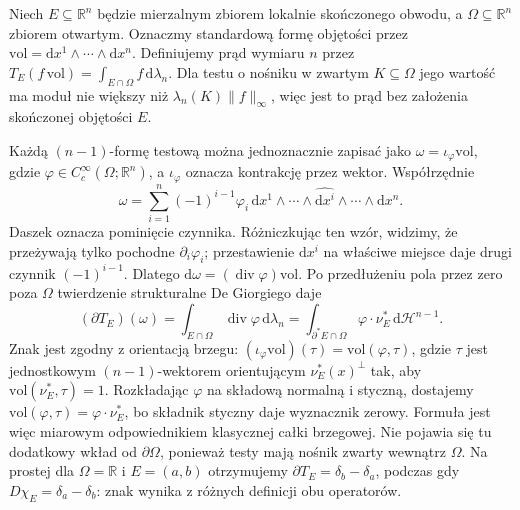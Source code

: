 \begin{przyklad}
Niech $E\subseteq\mathbb R^n$ będzie mierzalnym
zbiorem lokalnie skończonego obwodu, a
$\Omega\subseteq\mathbb R^n$ zbiorem otwartym.
Oznaczmy standardową formę objętości przez
$\mathrm{vol}=\mathrm dx^1\wedge\cdots\wedge\mathrm dx^n$.
Definiujemy prąd wymiaru $n$ przez
$T_E(f\,\mathrm{vol})=\int_{E\cap\Omega}
f\,\mathrm d\lambda_n$.
Dla testu o nośniku w zwartym $K\subseteq\Omega$
jego wartość ma moduł nie większy niż
$\lambda_n(K)\|f\|_\infty$, więc jest to prąd
bez założenia skończonej objętości $E$.

Każdą $(n-1)$-formę testową można jednoznacznie
zapisać jako $\omega=\iota_\varphi\mathrm{vol}$,
gdzie $\varphi\in C_c^\infty(\Omega;\mathbb R^n)$,
a $\iota_\varphi$ oznacza kontrakcję przez wektor.
Współrzędnie
\[
 \omega=\sum_{i=1}^n(-1)^{i-1}\varphi_i\,
 \mathrm dx^1\wedge\cdots\wedge
 \widehat{\mathrm dx^i}\wedge\cdots\wedge\mathrm dx^n.
\]
Daszek oznacza pominięcie czynnika. Różniczkując
ten wzór, widzimy, że przeżywają tylko pochodne
$\partial_i\varphi_i$; przestawienie $\mathrm dx^i$
na właściwe miejsce daje drugi czynnik
$(-1)^{i-1}$. Dlatego
$\mathrm d\omega=(\operatorname{div}\varphi)\mathrm{vol}$.
Po przedłużeniu pola przez zero poza $\Omega$
twierdzenie strukturalne De Giorgiego daje
\[
 (\partial T_E)(\omega)
 =\int_{E\cap\Omega}\operatorname{div}\varphi\,
 \mathrm d\lambda_n
 =\int_{\partial^*E\cap\Omega}\varphi\cdot\nu_E^*
 \,\mathrm d\mathcal H^{n-1}.
\]
Znak jest zgodny z orientacją brzegu:
$(\iota_\varphi\mathrm{vol})(\tau)
=\mathrm{vol}(\varphi,\tau)$, gdzie
$\tau$ jest jednostkowym $(n-1)$-wektorem
orientującym $\nu_E^*(x)^\perp$ tak,
aby $\mathrm{vol}(\nu_E^*,\tau)=1$.
Rozkładając $\varphi$ na składową normalną
i styczną, dostajemy
$\mathrm{vol}(\varphi,\tau)=\varphi\cdot\nu_E^*$,
bo składnik styczny daje wyznacznik zerowy.
Formuła jest więc miarowym odpowiednikiem
klasycznej całki brzegowej.
Nie pojawia się tu dodatkowy wkład od
$\partial\Omega$, ponieważ testy mają nośnik
zwarty wewnątrz $\Omega$.
Na prostej dla $\Omega=\mathbb R$ i $E=(a,b)$
otrzymujemy $\partial T_E=\delta_b-\delta_a$,
podczas gdy $D\chi_E=\delta_a-\delta_b$:
znak wynika z różnych definicji obu operatorów.
\end{przyklad}

